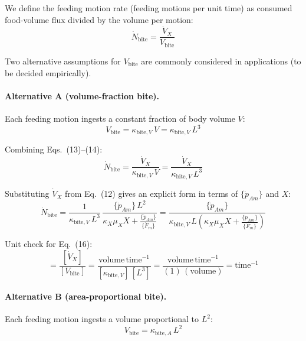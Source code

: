 \documentclass[11pt]{article}
\begin{document}
We define the feeding motion rate (feeding motions per unit time) as consumed food-volume flux divided by the volume per motion:
\begin{equation}
  \dot N_{\text{bite}} = \frac{\dot V_X}{V_{\text{bite}}}\tag{13}
\end{equation}

Two alternative assumptions for $V_{\text{bite}}$ are commonly considered in applications (to be decided empirically).

\paragraph{Alternative A (volume-fraction bite).} Each feeding motion ingests a constant fraction of body volume $V$:
\begin{equation}
  V_{\text{bite}} = \kappa_{\text{bite},V}\,V = \kappa_{\text{bite},V}\,L^3\tag{14}
\end{equation}

Combining Eqs.~(13)--(14):
\begin{equation}
  \dot N_{\text{bite}} = \frac{\dot V_X}{\kappa_{\text{bite},V}\,V} = \frac{\dot V_X}{\kappa_{\text{bite},V}\,L^3}\tag{15}
\end{equation}

Substituting $\dot V_X$ from Eq.~(12) gives an explicit form in terms of $\{\dot p_{Am}\}$ and $X$:
\begin{equation}
  \dot N_{\text{bite}}
  = \frac{1}{\kappa_{\text{bite},V}\,L^3}\,\frac{\{\dot p_{Am}\}\,L^2}{\kappa_X\mu_X X + \frac{\{\dot p_{Am}\}}{\{\dot F_m\}}}
  = \frac{\{\dot p_{Am}\}}{\kappa_{\text{bite},V}\,L\left(\kappa_X\mu_X X + \frac{\{\dot p_{Am}\}}{\{\dot F_m\}}\right)}\tag{16}
\end{equation}

Unit check for Eq.~(16):
\begin{equation*}
  [\dot N_{\text{bite}}] = \frac{[\dot V_X]}{[V_{\text{bite}}]} = \frac{\text{volume}\,\text{time}^{-1}}{[\kappa_{\text{bite},V}]\,[L^3]} = \frac{\text{volume}\,\text{time}^{-1}}{(1)\,(\text{volume})} = \text{time}^{-1}
\end{equation*}

\paragraph{Alternative B (area-proportional bite).} Each feeding motion ingests a volume proportional to $L^2$:
\begin{equation}
  V_{\text{bite}} = \kappa_{\text{bite},A}\,L^2\tag{17}
\end{equation}
\end{document}
